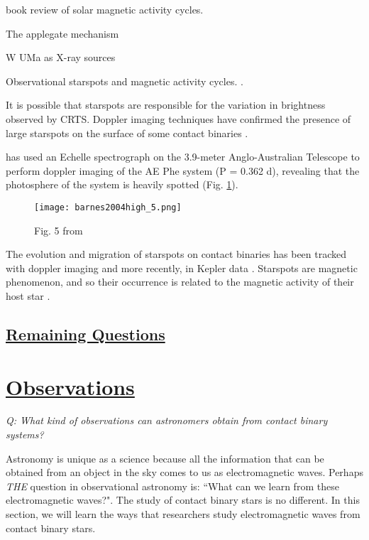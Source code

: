 \documentclass[12pt]{article} %
\numberwithin{equation}{section} %
\begin{document}
\citep{balogh2015solar} book review of solar magnetic activity cycles.

The applegate mechanism \citep{applegate1992mechanism} \citep{lanza2006internal}

W UMa as X-ray sources \citep{stepien2001rosat}

Observational starspots and magnetic activity cycles.  \citep{borkovits2005indirect,qian2000possible,kaszas1998period,qian2007ad,lee2004period,yang2012deep,zhang2004long}.

It is possible that starspots are responsible for the variation in brightness observed by CRTS. Doppler imaging techniques have confirmed the presence of large starspots on the surface of some contact binaries \citep{barnes2004high}. 

\citet{barnes2004high} has used an Echelle spectrograph on the 3.9-meter Anglo-Australian Telescope to perform doppler imaging of the AE Phe system (P = 0.362 d), revealing that the photosphere of the system is heavily spotted (Fig. \ref{fig: barnes2004high_5}).

\begin{figure}[H]
\centering
\texttt{[image: barnes2004high\_5.png]}
\caption{Fig. 5 from \citet{barnes2004high}}
\label{fig: barnes2004high_5}
\end{figure}

The evolution and migration of starspots on contact binaries has been tracked with doppler imaging \citep{hendry2000doppler} and more recently, in Kepler data \citep{tran2013anticorrelated, balaji2015tracking}. Starspots are magnetic phenomenon, and so their occurrence is related to the magnetic activity of their host star \citep{berdyugina2005starspots}.  

\subsection[Remaining Questions]{\hyperlink{toc}{Remaining Questions}} \label{sec: Remaining Questions}

\section[Observations]{\hyperlink{toc}{Observations}} \label{sec: observations}

\emph{Q: What kind of observations can astronomers obtain from contact binary systems?}

Astronomy is unique as a science because all the information that can be obtained from an object in the sky comes to us as electromagnetic waves. Perhaps \emph{THE} question in observational astronomy is: ``What can we learn from these electromagnetic waves?". The study of contact binary stars is no different. In this section, we will learn the ways that researchers study electromagnetic waves from contact binary stars.
\end{document}
